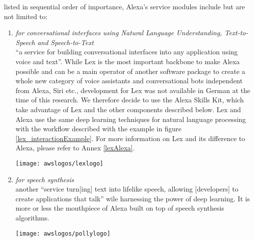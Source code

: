 listed in sequential order of importance, Alexa's service modules include but are not limited to: 

\begin{enumerate}

	\item[\href{https://aws.amazon.com/lex/}{\textbf{Lex}} \footnote{\url{https://aws.amazon.com/lex}}] \textit{for conversational interfaces using Natural Language Understanding, Text-to-Speech and Speech-to-Text} \\
	``a service for building conversational interfaces into any application using voice and text''\cite{aws_website}.
	While Lex is the most important backbone to make Alexa possible and can be a main operator of another software package to create a whole new category of voice assistants and conversational bots independent from Alexa, Siri etc., development for Lex was not available in German at the time of this research. We therefore decide to use the Alexa Skills Kit, which take advantage of Lex and the other components described below. Lex and Alexa use the same deep learning techniques for natural language processing with the workflow described with the example in figure \ref{lex_interactionExample}. For more information on Lex and its difference to Alexa, please refer to Annex \ref{lexAlexa}.
	
	\begin{restoretext}
		\begin{flushright}

			\texttt{[image: awslogos/lexlogo]}
		\end{flushright}

	\end{restoretext}

	
	
	\item[\href{https://aws.amazon.com/polly/}{\textbf{Polly}} \footnote{\url{https://aws.amazon.com/polly}}] \textit{for speech synthesis\\}
	another ``service turn[ing] text into lifelike speech, allowing [developers] to create applications that talk'' \cite{aws_website} wile harnessing the power of deep learning. It is more or less the mouthpiece of Alexa built on top of speech synthesis algorithms.
	
	
	\begin{restoretext}
		\begin{flushright}
		\texttt{[image: awslogos/pollylogo]}
		\end{flushright}
	\end{restoretext}
	

\end{enumerate}
